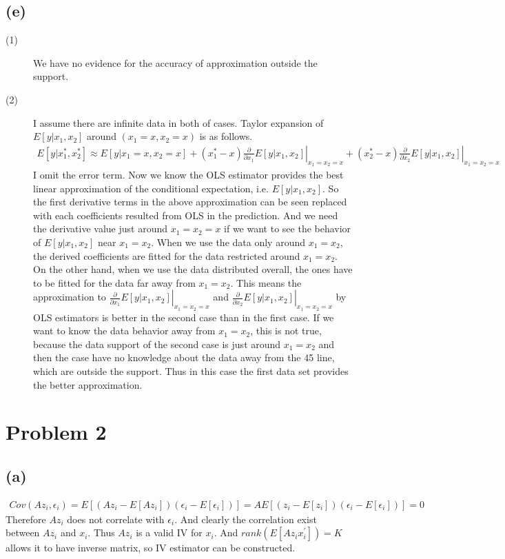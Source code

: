 \documentclass{article}
\begin{document}
\subsection{(e)}
\begin{description}
	\item[(1)] We have no evidence for the accuracy of approximation outside the support.
	\item[(2)] I assume there are infinite data in both of cases. Taylor expansion of $E[y | x_1, x_2]$ around $(x_1 = x, x_2 = x)$ is as follows.
	\begin{align*}
		E[y | x_1^*, x_2^*] \approx E[y | x_1 = x, x_2 = x] + (x_1^* - x) \left. \frac{\partial}{\partial x_1} E[y | x_1, x_2] \right|_{x_1 = x_2 = x} + (x_2^* - x)\left. \frac{\partial}{\partial x_2} E[y | x_1, x_2] \right|_{x_1 = x_2 = x} 
	\end{align*}
	I omit the error term. Now we know the OLS estimator provides the best linear approximation of the conditional expectation, i.e. $E[y | x_1, x_2]$. So the first derivative terms in the above approximation can be seen replaced with each coefficients resulted from OLS in the prediction. And we need the derivative value just around $x_1 = x_2 = x$ if we want to see the behavior of $E[y | x_1, x_2]$ near $x_1 = x_2$. When we use the data only around $x_1 = x_2$, the derived coefficients are fitted for the data restricted around $x_1 = x_2$. On the other hand, when we use the data distributed overall, the ones have to be fitted for the data far away from $x_1 = x_2$. This means the approximation to $\left. \frac{\partial}{\partial x_1} E[y | x_1, x_2] \right|_{x_1 = x_2 = x}$ and $\left. \frac{\partial}{\partial x_2} E[y | x_1, x_2] \right|_{x_1 = x_2 = x}$ by OLS estimators is better in the second case than in the first case. If we want to know the data behavior away from $x_1 = x_2$, this is not true, because the data support of the second case is just around $x_1 = x_2$ and then the case have no knowledge about the data away from the 45 line, which are outside the support. Thus in this case the first data set provides the better approximation.
\end{description}

\section{Problem 2}
\subsection{(a)}
\begin{align*}
	Cov(Az_i, \epsilon_i) = E[(Az_i - E[Az_i])(\epsilon_i - E[\epsilon_i])] = A E[(z_i - E[z_i])(\epsilon_i - E[\epsilon_i])] = 0
\end{align*}
Therefore $Az_i$ does not correlate with $\epsilon_i$. And clearly the correlation exist between $Az_i$ and $x_i$. Thus $Az_i$ is a valid IV for $x_i$. And $rank(E[Az_i x_i^{'}]) = K$ allows it to have inverse matrix, so IV estimator can be constructed.
\end{document}
